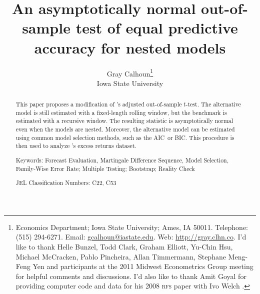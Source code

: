 \documentclass[12pt,fleqn]{article}
\newcommand\citepos[2][]{\citeauthor{#2}'s \citeyearpar[#1]{#2}}
\theoremstyle{definition}
\newcommand{\aic}{AIC}
\newcommand{\bic}{BIC}
\begin{document}
\author{Gray Calhoun\thanks{ Economics Department; Iowa State
    University; Ames, IA 50011.  Telephone: (515) 294-6271.  Email:
    \protect\url{gcalhoun@iastate.edu}.  Web:
    \protect\url{http://gray.clhn.co}.  I'd like to
    thank Helle Bunzel, Todd Clark, Graham Elliott, Yu-Chin Hsu,
    Michael McCracken, Pablo Pincheira, Allan Timmermann, Stephane
    Meng-Feng Yen and participants at the 2011 Midwest Econometrics
    Group meeting for helpful comments and discussions.  I'd also like to thank Amit
    Goyal for providing computer code and data for his 2008
    \textsc{rfs} paper with Ivo
    Welch \citep{GoW:08}.} \\
  Iowa State University}

\title{An asymptotically normal out-of-sample
  test of equal predictive accuracy for nested models} 


\maketitle

\begin{abstract} 
  \noindent This paper proposes a modification of \citepos[\textit{J.
    Econom.}]{ClW:07} adjusted out-of-sample $t$-test.  The
  alternative model is still estimated with a fixed-length rolling
  window, but the benchmark is estimated with a recursive window. The
  resulting statistic is asymptotically normal even when the models
  are nested.  Moreover, the alternative model can be estimated using
  common model selection methods, such as the \aic\ or \bic.
  This procedure is then used to analyze
  \citepos[\textit{Rev. Finan. Stud.}]{GoW:08} excess returns dataset.

\strut

\noindent Keywords: Forecast Evaluation, Martingale Difference
Sequence, Model Selection, Family-Wise Error Rate; Multiple Testing;
Bootstrap; Reality Check

\strut

\noindent JEL Classification Numbers: C22, C53

\end{abstract}

\newpage 
\end{document}
